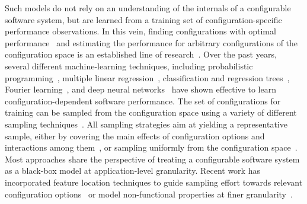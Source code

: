 
Such models do not rely on an understanding of the internals of a configurable software system, but are learned from a training set of configuration-specific performance observations. In this vein, finding configurations with optimal performance~\cite{nairUsingBadLearners2017,nairFlash18,ohFindingNearoptimalConfigurations2017} and estimating the performance for arbitrary configurations of the configuration space is an established line of research~\cite{siegmundPerformanceinfluenceModelsHighly2015,haDeepPerf2019,perfAL,guoVariabilityawarePerformancePrediction2013,sarkarCostEfficientSamplingPerformance,guo_2018_data,fourier_learning_2015,perLasso}.
Over the past years, several different machine-learning techniques, including probabilistic programming~\cite{dorn2020}, multiple linear regression~\cite{siegmundPerformanceinfluenceModelsHighly2015}, classification and regression trees~\cite{guoVariabilityawarePerformancePrediction2013,sarkarCostEfficientSamplingPerformance,guo_2018_data}, Fourier learning~\cite{fourier_learning_2015,perLasso}, and deep neural networks~\cite{haDeepPerf2019,perfAL} have shown effective to learn configuration-dependent software performance.
The set of configurations for training can be sampled from the configuration space using a variety of different sampling techniques~\cite{kaltenecker_interplay_2020}. All sampling strategies aim at yielding a representative sample, either by covering the main effects of configuration options and interactions among them~\cite{siegmundPredictingPerformanceAutomated2012}, or sampling uniformly from the configuration space~\cite{ohFindingNearoptimalConfigurations2017,kaltenecker_distance-based_2019}.
Most approaches share the perspective of treating a configurable software system as a black-box model at application-level granularity. Recent work has incorporated feature location techniques to guide sampling effort towards relevant configuration options~\cite{velez_2020_configcrusher_jase,velez_comprex_2021} or model non-functional properties at finer granularity~\cite{weber_white_2021,han_confprof_2021}.

